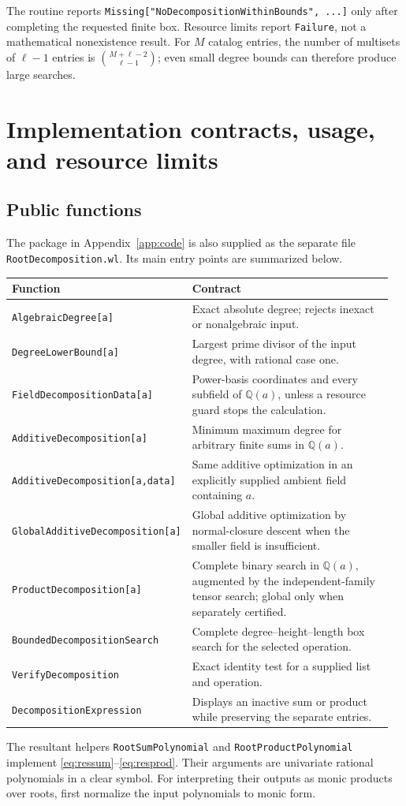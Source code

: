 \documentclass[11pt,letterpaper]{article}
\theoremstyle{definition}
\theoremstyle{remark}
\newcommand{\Q}{\mathbb Q}
\newcommand{\wl}[1]{\texttt{#1}}
\begin{document}
The routine reports \wl{Missing["NoDecompositionWithinBounds", ...]}
only after completing the requested finite box. Resource limits report
\wl{Failure}, not a mathematical nonexistence result. For \(M\) catalog
entries, the number of multisets of \(\ell-1\) entries is
\(\binom{M+\ell-2}{\ell-1}\); even small degree bounds can therefore
produce large searches.

\section{Implementation contracts, usage, and resource limits}
\label{sec:implementation}
\subsection{Public functions}
The package in Appendix~\ref{app:code} is also supplied as the separate
file \wl{RootDecomposition.wl}. Its main entry points are summarized below.

\begin{longtable}{@{}>{\raggedright\arraybackslash}p{0.39\linewidth}>{\raggedright\arraybackslash}p{0.57\linewidth}@{}}
\toprule
\textbf{Function} & \textbf{Contract}\\\midrule
\endhead
\wl{AlgebraicDegree[a]} & Exact absolute degree; rejects inexact or nonalgebraic input.\\[4pt]
\wl{DegreeLowerBound[a]} & Largest prime divisor of the input degree, with rational case one.\\[4pt]
\wl{FieldDecompositionData[a]} & Power-basis coordinates and every subfield of \(\Q(a)\), unless a resource guard stops the calculation.\\[4pt]
\wl{AdditiveDecomposition[a]} & Minimum maximum degree for arbitrary finite sums in \(\Q(a)\).\\[4pt]
\wl{AdditiveDecomposition[a,data]} & Same additive optimization in an explicitly supplied ambient field containing \(a\).\\[4pt]
\wl{GlobalAdditiveDecomposition[a]} & Global additive optimization by normal-closure descent when the smaller field is insufficient.\\[4pt]
\wl{ProductDecomposition[a]} & Complete binary search in \(\Q(a)\), augmented by the independent-family tensor search; global only when separately certified.\\[4pt]
\wl{BoundedDecompositionSearch} & Complete degree--height--length box search for the selected operation.\\[4pt]
\wl{VerifyDecomposition} & Exact identity test for a supplied list and operation.\\[4pt]
\wl{DecompositionExpression} & Displays an inactive sum or product while preserving the separate entries.\\
\bottomrule
\end{longtable}
The resultant helpers \wl{RootSumPolynomial} and
\wl{RootProductPolynomial} implement \eqref{eq:ressum}--\eqref{eq:resprod}.
Their arguments are univariate rational polynomials in a clear symbol.
For interpreting their outputs as monic products over roots, first normalize
the input polynomials to monic form.
\end{document}
